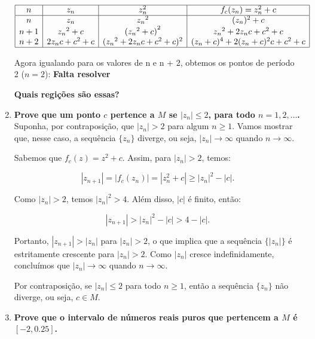 \begin{enumerate}[label=(\alph*)]
        \[
        \begin{array}{|c|c|c|c|}
        \hline
        n & z_n & z_n^2 & f_c(z_n) = z_n^2 + c \\
        \hline
        n & z_n & {z_n}^2 & ({z_n})^2 + c \\
        n + 1 & {z_n}^2 + c & {({z_n}^2 + c)}^2 & {z_n}^2  + 2 z_n c + c^2 + c \\
        n + 2 & 2 z_n c + c^2 + c & ({z_n}^2+ 2 z_n c + c^2 + c)^2 & (z_n + c)^4 + 2(z_n + c)^2 c + c^2 + c\\      \hline
        \end{array}
        \]

        Agora igualando para os valores de n e n + 2, obtemos os pontos de período 2 (\( n = 2 \)):
           \textbf{\color{red}Falta resolver}


        \textbf{\color{red} Quais regições são essas?}


    \item \textbf{Prove que um ponto \( c \) pertence a \( M \) se \( |z_n| \leq 2 \), para todo \( n = 1, 2, \ldots \). }\\

        Suponha, por contraposição, que \( |z_n| > 2 \) para algum \( n \geq 1 \). Vamos mostrar que, nesse caso, a sequência \( \{z_n\} \) diverge, ou seja, \( |z_n| \to \infty \) quando \( n \to \infty \).

        Sabemos que \( f_c(z) = z^2 + c \). Assim, para \( |z_n| > 2 \), temos:

        \[
        |z_{n+1}| = |f_c(z_n)| = |z_n^2 + c| \geq |z_n|^2 - |c|.
        \]

        Como \( |z_n| > 2 \), temos \( |z_n|^2 > 4 \). Além disso, \( |c| \) é finito, então:

        \[
        |z_{n+1}| > |z_n|^2 - |c| > 4 - |c|.
        \]

        Portanto, \( |z_{n+1}| > |z_n| \) para \( |z_n| > 2 \), o que implica que a sequência \( \{|z_n|\} \) é estritamente crescente para \( |z_n| > 2 \). Como \( |z_n| \) cresce indefinidamente, concluímos que \( |z_n| \to \infty \) quando \( n \to \infty \).

        Por contraposição, se \( |z_n| \leq 2 \) para todo \( n \geq 1 \), então a sequência \( \{z_n\} \) não diverge, ou seja, \( c \in M \).


    \item \textbf{Prove que o intervalo de números reais puros que pertencem a \( M \) é \( [-2, 0.25] \). }\\
    

\end{enumerate}
